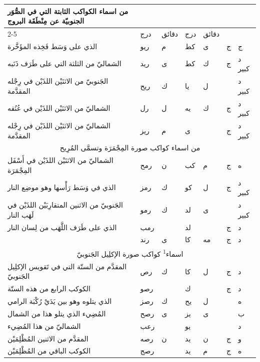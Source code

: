 \documentclass[11pt]{article}
\newcommand{\AbjadZero}{{\NallinoSigns\symbol{"E000}}}
\begin{document}
\begin{Arabic}\begin{tabular}{|p{84mm}|>{\centering\arraybackslash}p{9mm}|>{\centering\arraybackslash}p{9mm}|>{\centering\arraybackslash}p{9mm}|>{\centering\arraybackslash}p{9mm}|>{\centering\arraybackslash}p{14mm}|>{\centering\arraybackslash}p{17mm}|}\hline
\multirow{2}{*}{\parbox{80mm}{\centering من اسماء الكواكب الثابتة التي في الصُّوَر الجنوبيّة عن مِنْطَقَة البروج}} & \multicolumn{2}{c|}{الطول} & \multicolumn{2}{c|}{العرض} & \multirow{2}{*}{\parbox{13mm}{\centering\small علامات الجهة}} & \multirow{2}{*}{\parbox{16mm}{\centering\small مراتب العظمة}} \\ \cline{2-5}
 & {\small درج} & {\small دقائق} & {\small درج} & {\small دقائق} & & \\ \hline
الذي على وَسَط فَخِذه المؤَخَّرة & ريو & م & كط & ى & ج & ج \\
الشماليّ من الثلثة التي على طَرَف ذَنَبه & ريد & ى & كط & ك & ج & د كبير \\
الجَنوبيّ من الاثنَيْن اللذَيْن في رِجْله المقدَّمة & ريح & ك & يا & ل &  & د كبير \\
الشماليّ من الاثنَيْن اللذَيْن في عُنُقه & رل & ل & يه & ك & ج & د كبير \\
الشماليّ من الاثنَيْن اللذَيْن في رِجْله المقدَّمة & ريز & م & ى & \AbjadZero{} & ج & د كبير \\
\hline
\multicolumn{7}{|c|}{\large من اسماء كواكب صورة المِجْمَرَة وتسمَّى المُرِيح} \\ \hline
الشماليّ من الاثنَيْن اللذَيْن في أَسْفَل المِجْمَرَة & رمح & ن & كب & م & ج & ه \\
الذي في وَسَط رَأْسها وهو موضِع النار & رمز & ك & كو & ل & ج & د كبير \\
الجَنوبيّ من الاثنين المتقارِبَيْن اللذَيْن في لَهَب النار & رمو & ك & لد & ى &  & د كبير \\
الذي على طَرَف اللَّهَب من لِسان النار & رمب & \AbjadZero{} & لد & \AbjadZero{} & ج & د \\
 & رند & ى & كا & مه & ج & د \\
\hline
\multicolumn{7}{|c|}{\large اسماء\textsuperscript{1} كواكب صورة الإكلِيل الجَنوبيّ} \\ \hline
المقدَّم من الستّة التي في تَقويس الإكلِيل الجَنوبيّ & رص & ك & كا & ل & ج & د \\
الكوكب الرابع من هذه الستّة & رصو & \AbjadZero{} & ك & \AbjadZero{} & ج & د \\
الذي يتلوه وهو بين يَدَيْ رُكْبَة الرامي & رصز & ك & يح & ل &  & ه \\
المُضِيء الذي يتلو هذا من الشمال & رصح & ى & يز & ى &  & ب \\
الشماليّ من هذا المُضِيء & رعب & \AbjadZero{} & يو & \AbjadZero{} &  & د \\
المقدَّم من الاثنين المُظْلِمَيْن & رصه & ن & يد & ن & ج & و \\
الكوكب الباقي من المُظْلِمَيْن & رصج & \AbjadZero{} & يد & م & ج & ه \\
\hline
\end{tabular}\end{Arabic}
\end{document}
